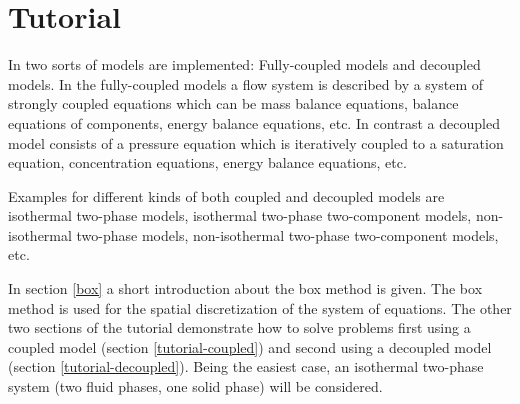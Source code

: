 \chapter[Tutorial]{Tutorial}\label{chp:tutorial}

In \Dumux two sorts of models are implemented: Fully-coupled models and decoupled models. In the fully-coupled models a flow system is described by a system of strongly coupled equations which can be mass balance equations, balance equations of components, energy balance equations, etc. In contrast a decoupled model consists of a pressure equation which is iteratively coupled to a saturation equation, concentration equations, energy balance equations, etc.

Examples for different kinds of both coupled and decoupled models are isothermal two-phase models, isothermal two-phase two-component models, non-isothermal two-phase models, non-isothermal two-phase two-component models, etc.

In section \ref{box} a short introduction about the box method is given. The box method is used for the spatial discretization of the system of equations. The other two sections of the tutorial demonstrate how to solve problems first using a coupled model (section \ref{tutorial-coupled}) and second using a decoupled model (section \ref{tutorial-decoupled}). Being the easiest case, an isothermal two-phase system (two fluid phases, one solid phase) will be considered.


%
